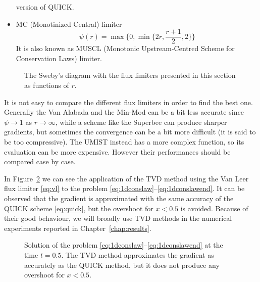 \begin{itemize}
	version of QUICK.
%
	\item MC (Monotinized Central) limiter \cite{tvd:mclimiter}
	\begin{equation} \label{eq:mclim}
	\psi(r)=\max \bigg\{0, \min \bigg\{ 2r, \frac{r+1}{2}, 2\bigg\} \bigg\}
	\end{equation}
	It is also known as MUSCL (Monotonic Upstream-Centred Scheme for 
	Conservation Laws) limiter.
%	
\end{itemize}
\begin{figure}[t]
	\centering
	
	\caption[Flux limiter functions]{The Sweby's diagram with the flux limiters 
	presented in this section as functions of $r$.}
	\label{fig:fluxlimiters}
\end{figure}

It is not easy to compare the different flux limiters in order to find the 
best one. Generally the Van Alabada and the Min-Mod can be a bit less accurate 
since $\psi \rightarrow 1$ as $r \rightarrow \infty$, while a scheme like the 
Superbee can produce sharper gradients, but sometimes the convergence can be a 
bit more difficult (it is said to be too compressive). The UMIST instead has a 
more complex function, so its evaluation can be more expensive. However their 
performances should be compared case by case.

In Figure~\ref{fig:1dconslawtvd} we can see the application of the TVD method 
using the Van Leer flux limiter \eqref{eq:vl} to the problem 
\eqref{eq:1dconslaw}--\eqref{eq:1dconslawend}. It can be observed that the 
gradient is approximated with the same accuracy of the QUICK scheme 
\eqref{eq:quick}, but the overshoot for $x<0.5$ is avoided. Because of their 
good behaviour, we will broadly use TVD methods in the numerical experiments 
reported in Chapter~\ref{chap:results}.
\begin{figure}
	\centering
	
	\caption[Solution of a one-dimensional scalar conservation law using a TVD 
	method]{Solution of the problem 
	\eqref{eq:1dconslaw}--\eqref{eq:1dconslawend} at the time 
	$t=0.5$. The TVD method approximates the gradient as accurately as the 
	QUICK method, but it does not produce any overshoot for $x<0.5$.}
	\label{fig:1dconslawtvd}
\end{figure}
%
